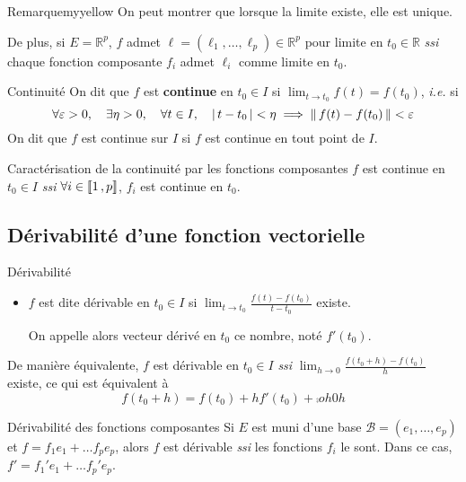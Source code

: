     \begin{omed}{Remarque}{myyellow}
        On peut montrer que lorsque la limite existe, elle est unique. 
        
        De plus, si $E = \mathbb{R}^p$, $f$ admet $\ell = (\ell_1,\ldots,\ell_p) \in \mathbb{R}^p$ pour limite en $t_0 \in \mathbb{R}$ \textit{ssi} chaque fonction composante $f_i$ admet $\ell_i$ comme limite en $t_0$.
    \end{omed}

    \begin{defi}{Continuité}{}
        On dit que $f$ est \textbf{continue} en $t_0 \in I$ si $\lim_{t \to t_0} f(t) = f(t_0)$, \textit{i.e.} si 
        \[ \forall \varepsilon > 0, \quad \exists \eta > 0, \quad \forall t \in I, \quad \left\lvert \,t - t_0 \, \right\rvert < \eta \implies \left\lVert \,f(t) - f(t_0) \, \right\rVert < \varepsilon \]
        On dit que $f$ est continue sur $I$ si $f$ est continue en tout point de $I$.
    \end{defi}

    \begin{prop}{Caractérisation de la continuité par les fonctions composantes}{}
        $f$ est continue en $t_0 \in I$ \textit{ssi} $\forall i \in \left\llbracket 1 \, , p \right\rrbracket$, $f_i$ est continue en $t_0$.
    \end{prop}

\subsection{Dérivabilité d’une fonction vectorielle}

    \begin{defi}{Dérivabilité}{}
        \begin{itemize}
            \item $f$ est dite dérivable en $t_0 \in I$ si $\lim_{t \to t_0} \frac{f(t) - f(t_0)}{t - t_0}$ existe.
            
            On appelle alors vecteur dérivé en $t_0$ ce nombre, noté $f'(t_0)$.
        \end{itemize}
    \end{defi}

    De manière équivalente, $f$ est dérivable en $t_0 \in I$ \textit{ssi} $\lim_{h \to 0} \frac{f(t_0 + h) - f(t_0)}{h}$ existe, ce qui est équivalent à 
    \[ f(t_0 + h) = f(t_0) + hf'(t_0) + \comp{o}{h}{0}{h} \]

    \begin{prop}{Dérivabilité des fonctions composantes}{}
        Si $E$ est muni d’une base $\mathcal{B} = (e_1,\ldots, e_p)$ et $f = f_1 e_1 + \ldots f_p e_p$, alors $f$ est dérivable \textit{ssi} les fonctions $f_i$ le sont. Dans ce cas, $f' = f_1' e_1  + \ldots f_p' e_p$.
    \end{prop}

